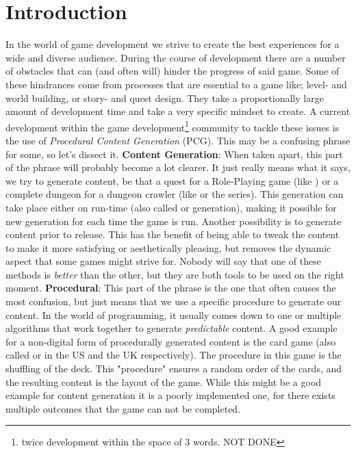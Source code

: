 
\chapter{Introduction}
In the world of game development we strive to create the best experiences for a wide and diverse audience. During the course of development there are a number of obstacles that can (and often will) hinder the progress of said game. Some of these hindrances come from processes that are essential to a game like; level- and world building, or story- and quest design. They take a proportionally large amount of development time and take a very specific mindset to create. 
A current development within the game development\footnote{twice development within the space of 3 words. NOT DONE} community to tackle these issues is the use of \textit{Procedural Content Generation} (PCG). This may be a confusing phrase for some, so let's dissect it. 
\textbf{Content Generation}: When taken apart, this part of the phrase will probably become a lot clearer. It just really means what it says, we try to generate content, be that a quest for a Role-Playing game (like ) or a complete dungeon for a dungeon crawler (like  or the  series). This generation can take place either on run-time (also called  or  generation), making it possible for new generation for each time the game is run. Another possibility is to generate content prior to release. This has the benefit of being able to tweak the content to make it more satisfying or aesthetically pleasing, but removes the dynamic aspect that some games might strive for. Nobody will say that one of these methods is \emph{better} than the other, but they are both tools to be used on the right moment.
\textbf{Procedural}: This part of the phrase is the one that often causes the most confusion, but just means that we use a specific procedure to generate our content. In the world of programming, it usually comes down to one or multiple algorithms that work together to generate \emph{predictable} content. A good example for a non-digital form of procedurally generated content is the card game  (also called  or  in the US and the UK respectively). The procedure in this game is the shuffling of the deck. This "procedure" ensures a random order of the cards, and the resulting content is the layout of the game. While this might be a good example for content generation it is a poorly implemented one, for there exists multiple outcomes that the game can not be completed.

